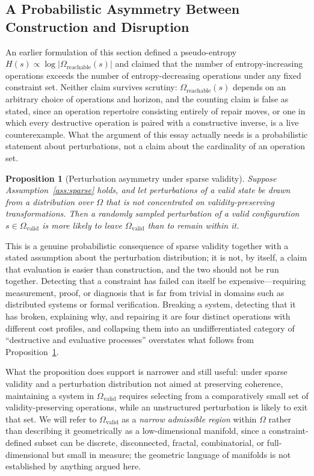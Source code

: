 \documentclass[12pt, a4paper]{article}
\theoremstyle{plain}
\newtheorem{proposition}{Proposition}[section]
\theoremstyle{definition}
\theoremstyle{remark}
\begin{document}
\subsection{A Probabilistic Asymmetry Between Construction and Disruption}
\label{subsec:asymmetry}

An earlier formulation of this section defined a pseudo-entropy $H(s) \propto \log|\Omega_{\mathrm{reachable}}(s)|$ and claimed that the number of entropy-increasing operations exceeds the number of entropy-decreasing operations under any fixed constraint set. Neither claim survives scrutiny: $\Omega_{\mathrm{reachable}}(s)$ depends on an arbitrary choice of operations and horizon, and the counting claim is false as stated, since an operation repertoire consisting entirely of repair moves, or one in which every destructive operation is paired with a constructive inverse, is a live counterexample. What the argument of this essay actually needs is a probabilistic statement about perturbations, not a claim about the cardinality of an operation set.

\begin{proposition}[Perturbation asymmetry under sparse validity]
\label{prop:asymmetry}
Suppose Assumption~\ref{ass:sparse} holds, and let perturbations of a valid state be drawn from a distribution over $\Omega$ that is not concentrated on validity-preserving transformations. Then a randomly sampled perturbation of a valid configuration $s \in \Omega_{\mathrm{valid}}$ is more likely to leave $\Omega_{\mathrm{valid}}$ than to remain within it.
\end{proposition}

This is a genuine probabilistic consequence of sparse validity together with a stated assumption about the perturbation distribution; it is not, by itself, a claim that evaluation is easier than construction, and the two should not be run together. Detecting that a constraint has failed can itself be expensive---requiring measurement, proof, or diagnosis that is far from trivial in domains such as distributed systems or formal verification. Breaking a system, detecting that it has broken, explaining why, and repairing it are four distinct operations with different cost profiles, and collapsing them into an undifferentiated category of ``destructive and evaluative processes'' overstates what follows from Proposition~\ref{prop:asymmetry}.

What the proposition does support is narrower and still useful: under sparse validity and a perturbation distribution not aimed at preserving coherence, maintaining a system in $\Omega_{\mathrm{valid}}$ requires selecting from a comparatively small set of validity-preserving operations, while an unstructured perturbation is likely to exit that set. We will refer to $\Omega_{\mathrm{valid}}$ as a \emph{narrow admissible region} within $\Omega$ rather than describing it geometrically as a low-dimensional manifold, since a constraint-defined subset can be discrete, disconnected, fractal, combinatorial, or full-dimensional but small in measure; the geometric language of manifolds is not established by anything argued here.
\end{document}
